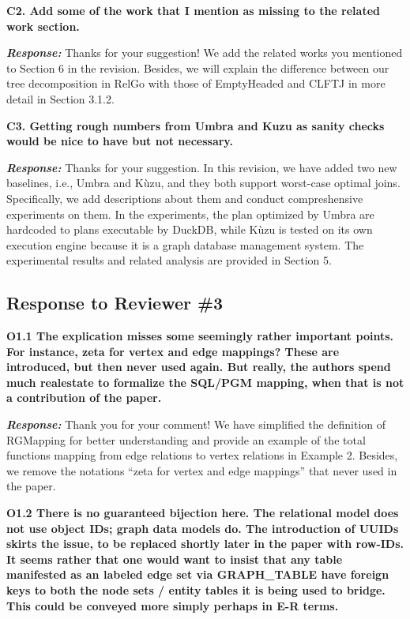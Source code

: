 \textbf{
C2. Add some of the work that I mention as missing to the related work section.}

\textbf{\textit{Response: }} Thanks for your suggestion! We add the related works you mentioned to Section 6 in the revision. Besides, we will explain the difference between our tree decomposition in RelGo with those of EmptyHeaded and CLFTJ in more detail in Section 3.1.2.


\textbf{
C3. Getting rough numbers from Umbra and Kuzu as sanity checks would be nice to have but not necessary.}

\textbf{\textit{Response: }}
Thanks for your suggestion.
In this revision, we have added two new baselines, i.e., Umbra and K\`uzu, and they both support worst-case optimal joins.
Specifically, we add descriptions about them and conduct compreshensive experiments on them.
In the experiments, the plan optimized by Umbra are hardcoded to plans executable by DuckDB, while K\`uzu is tested on its own execution engine because it is a graph database management system.
The experimental results and related analysis are provided in Section 5.


\subsection{Response to Reviewer \#3}

\textbf{
O1.1 The explication misses some seemingly rather important points.
For instance, zeta for vertex and edge mappings? These are introduced, but then never used again. But really, the authors spend much realestate to formalize the SQL/PGM mapping, when that is not a contribution of the paper.}

\textbf{\textit{Response: }}
Thank you for your comment! We have simplified the definition of RGMapping for better understanding and provide an example of the total functions mapping from edge relations to vertex relations in Example 2.
Besides, we remove the notations ``zeta for vertex and edge mappings'' that never used in the paper.


\textbf{
O1.2 There is no guaranteed bijection here. The relational model does not use object IDs; graph data models do. The introduction of UUIDs skirts the issue, to be replaced shortly later in the paper with row-IDs. It seems rather that one would want to insist that any table manifested as an labeled edge set via GRAPH\_TABLE have foreign keys to both the node sets / entity tables it is being used to bridge. This could be conveyed more simply perhaps in E-R terms.}

